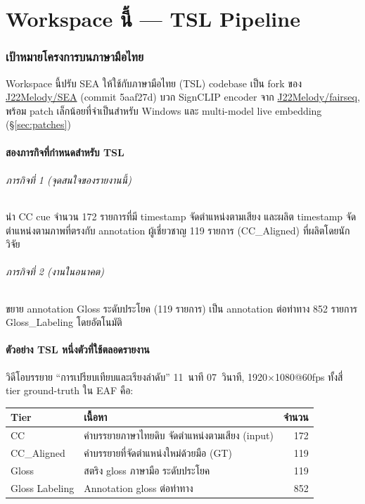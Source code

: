 \documentclass[11pt,a4paper]{article}
\def\texttt#1{#1}%
\def\textbf#1{#1}%
\def\emph#1{#1}%
\begin{document}
\clearpage
\part{Workspace นี้ --- TSL Pipeline}

\section{เป้าหมายโครงการบนภาษามือไทย}

Workspace นี้ปรับ SEA ให้ใช้กับภาษามือไทย (TSL)
codebase เป็น fork ของ \href{https://github.com/J22Melody/SEA}{J22Melody/SEA}
(commit \texttt{5aaf27d}) บวก SignCLIP encoder จาก
\href{https://github.com/J22Melody/fairseq}{J22Melody/fairseq},
พร้อม patch เล็กน้อยที่จำเป็นสำหรับ Windows และ multi-model live embedding
(\S\ref{sec:patches})

\subsection{สองภารกิจที่กำหนดสำหรับ TSL}
\paragraph{ภารกิจที่ 1 (จุดสนใจของรายงานนี้)}
นำ CC cue จำนวน 172 รายการที่มี timestamp จัดตำแหน่งตามเสียง
และผลิต timestamp จัดตำแหน่งตามภาพที่ตรงกับ annotation ผู้เชี่ยวชาญ
119 รายการ (\texttt{CC\_Aligned}) ที่ผลิตโดยนักวิจัย

\paragraph{ภารกิจที่ 2 (งานในอนาคต)}
ขยาย annotation Gloss ระดับประโยค (119 รายการ)
เป็น annotation ต่อท่าทาง 852 รายการ \texttt{Gloss\_Labeling}
โดยอัตโนมัติ

\subsection{ตัวอย่าง TSL หนึ่งตัวที่ใช้ตลอดรายงาน}
วิดีโอบรรยาย \emph{``การเปรียบเทียบและเรียงลำดับ''} 11~นาที 07~วินาที,
1920$\times$1080@60fps ทั้งสี่ tier ground-truth ใน EAF คือ:

\begin{table}[h]
\centering
\small
\begin{tabularx}{\linewidth}{lXr}
\toprule
\textbf{Tier} & \textbf{เนื้อหา} & \textbf{จำนวน} \\
\midrule
\texttt{CC}             & คำบรรยายภาษาไทยดิบ จัดตำแหน่งตามเสียง (input) & 172 \\
\texttt{CC\_Aligned}    & คำบรรยายที่จัดตำแหน่งใหม่ด้วยมือ \emph{(GT)}  & 119 \\
\texttt{Gloss}          & สตริง gloss ภาษามือ ระดับประโยค                & 119 \\
\texttt{Gloss Labeling} & Annotation gloss ต่อท่าทาง                     & 852 \\
\bottomrule
\end{tabularx}
\end{table}
\end{document}
